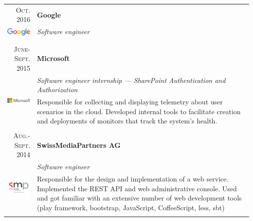 \documentclass[a4paper,11pt]{article} %
\begin{document}
\begin{tabularx}{\textwidth}{r|X}

\textsc{Oct. 2016} & \textbf{Google} \\
\multirow{2}{*}{ \includegraphics[width=60pt]{img/google.eps}}
& \emph{Software engineer}\\ 
& \footnotesize{}\\
\multicolumn{2}{c}{} \\


\textsc{June-Sept. 2015} & \textbf{Microsoft} \\
\multirow{2}{*}{ \includegraphics[width=60pt]{img/microsoft.eps}}
& \emph{Software engineer internship --- SharePoint Authentication and Authorization}\\ 
& \footnotesize{Responsible for collecting and displaying telemetry about user
scenarios in the cloud. Developed internal tools to facilitate creation and deployments
of monitors that track the system's health.}\\
\multicolumn{2}{c}{} \\


\textsc{Aug.-Sept. 2014} & \textbf{SwissMediaPartners AG} \\
\multirow{4}{*}{ \includegraphics[width=60pt]{img/smp.jpg}}
& \emph{Software engineer}\\ 
& \footnotesize{Responsible for the design and implementation of a web
service. Implemented the REST API and web administrative console. Used
and got familiar with an extensive number of web development tools (play
framework, bootstrap, JavaScript, CoffeeScript, less, sbt)}\\ 
\multicolumn{2}{c}{} \\


\end{tabularx}
\end{document}

